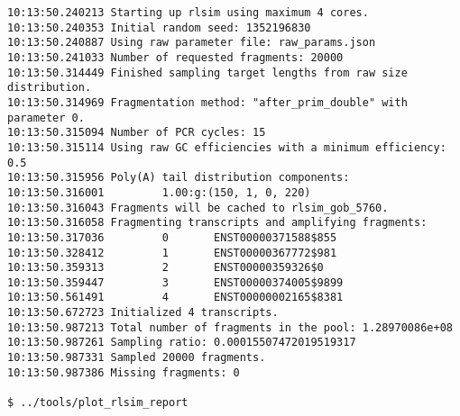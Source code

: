 \begin{itemize}
{\begin{verbatim}
10:13:50.240213 Starting up rlsim using maximum 4 cores.
10:13:50.240353 Initial random seed: 1352196830
10:13:50.240887 Using raw parameter file: raw_params.json
10:13:50.241033 Number of requested fragments: 20000
10:13:50.314449 Finished sampling target lengths from raw size distribution.
10:13:50.314969 Fragmentation method: "after_prim_double" with parameter 0.
10:13:50.315094 Number of PCR cycles: 15
10:13:50.315114 Using raw GC efficiencies with a minimum efficiency: 0.5
10:13:50.315956 Poly(A) tail distribution components:
10:13:50.316001         1.00:g:(150, 1, 0, 220)
10:13:50.316043 Fragments will be cached to rlsim_gob_5760.
10:13:50.316058 Fragmenting transcripts and amplifying fragments:
10:13:50.317036         0       ENST00000371588$855
10:13:50.328412         1       ENST00000367772$981
10:13:50.359313         2       ENST00000359326$0
10:13:50.359447         3       ENST00000374005$9899
10:13:50.561491         4       ENST00000002165$8381
10:13:50.672723 Initialized 4 transcripts.
10:13:50.987213 Total number of fragments in the pool: 1.28970086e+08
10:13:50.987261 Sampling ratio: 0.00015507472019519317
10:13:50.987331 Sampled 20000 fragments.
10:13:50.987386 Missing fragments: 0

$ ../tools/plot_rlsim_report
\end{verbatim}

}
\end{itemize}

